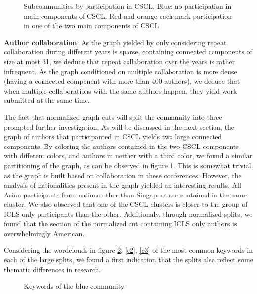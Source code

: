 \documentclass[article,twocolumn]{IEEEtran}
\begin{document}
    \begin{figure}
        \begin{center}\end{center}
        \caption{Subcommunities by participation in CSCL. Blue: no participation in main components of CSCL. Red and orange each mark participation in one of the two main components of CSCL}
        \label{CSCL_components}
    \end{figure}
    
    \textbf{Author collaboration}: As the graph yielded by only considering
repeat collaboration during different years is sparse, containing
connected components of size at most 31, we deduce that repeat
collaboration over the years is rather infrequent. As the graph
conditioned on multiple collaboration is more dense (having a connected
component with more than 400 authors), we deduce that when multiple
collaborations with the same authors happen, they yield work submitted
at the same time.

The fact that normalized graph cuts will split the community into three
prompted further investigation. As will be discussed in the next
section, the graph of authors that participanted in CSCL yields two
large connected components. By coloring the authors contained in the two
CSCL components with different colors, and authors in neither with a
third color, we found a similar partitioning of the graph, as can be
observed in figure \ref{CSCL_components}. This is somewhat trivial, as
the graph is built based on collaboration in these conferences. However,
the analysis of nationalities present in the graph yielded an
interesting results. All Asian participants from nations other than
Singapore are contained in the same cluster. We also observed that one
of the CSCL clusters is closer to the group of ICLS-only participants
than the other. Additionaly, through normalized splits, we found that
the section of the normalized cut containing ICLS only authors is
overwhelmingly American.

Considering the wordclouds in figure \ref{c1}, \ref{c2}, \ref{c3} of the
most common keywords in each of the large splits, we found a first
indication that the splits also reflect some thematic differences in
research.


    \begin{figure}
        \begin{center}\end{center}
        \caption{Keywords of the blue community}
        \label{c1}
    \end{figure}
    
\end{document}
